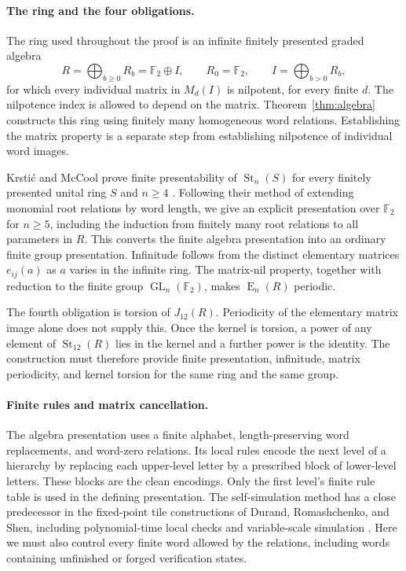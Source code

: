 \documentclass[11pt]{article}
\numberwithin{equation}{section}
\theoremstyle{definition}
\theoremstyle{remark}
\newcommand{\F}{\mathbb F}
\DeclareMathOperator{\St}{St}
\DeclareMathOperator{\E}{E}
\DeclareMathOperator{\GL}{GL}
\begin{document}
\paragraph{The ring and the four obligations.}
The ring used throughout the proof is an infinite finitely presented
graded algebra
\[
 R=\bigoplus_{b\geq0}R_b=\F_2\oplus I,
 \qquad R_0=\F_2,\qquad I=\bigoplus_{b>0}R_b,
\]
for which every individual matrix in $M_d(I)$ is nilpotent, for every
finite $d$. The nilpotence index is allowed to depend on the matrix.
Theorem~\ref{thm:algebra} constructs this ring using finitely many
homogeneous word relations. Establishing the matrix property is a
separate step from establishing nilpotence of individual word images.

Krsti\'c and McCool prove finite presentability of $\St_n(S)$ for
every finitely presented unital ring $S$ and $n\geq4$
\cite[Theorem~3]{KrsticMcCool}. Following their method of extending
monomial root relations by word length, we give an explicit presentation
over $\F_2$ for $n\geq5$, including the induction from finitely many
root relations to all parameters in $R$. This converts the finite algebra presentation into an ordinary
finite group presentation. Infinitude follows from the distinct
elementary matrices $e_{ij}(a)$ as $a$ varies in the infinite ring.
The matrix-nil property, together with reduction to the finite group
$\GL_n(\F_2)$, makes $\E_n(R)$ periodic.

The fourth obligation is torsion of $J_{12}(R)$. Periodicity of the
elementary matrix image alone does not supply this. Once the kernel is
torsion, a power of any element of $\St_{12}(R)$ lies in the kernel
and a further power is the identity. The construction must therefore
provide finite presentation, infinitude, matrix periodicity, and kernel
torsion for the same ring and the same group.

\paragraph{Finite rules and matrix cancellation.}
The algebra presentation uses a finite alphabet, length-preserving word
replacements, and word-zero relations. Its local rules encode the next
level of a hierarchy by replacing each upper-level letter by a prescribed
block of lower-level letters. These blocks are the clean encodings.
Only the first level's finite rule table is used in the defining
presentation. The self-simulation method has a
close predecessor in the fixed-point tile constructions of Durand,
Romashchenko, and Shen, including polynomial-time local checks and
variable-scale simulation \cite[Sections~2.3 and~5]{DurandRomashchenkoShen2012}.
Here we must also control every finite word allowed by the relations,
including words containing unfinished or forged verification states.
\end{document}
